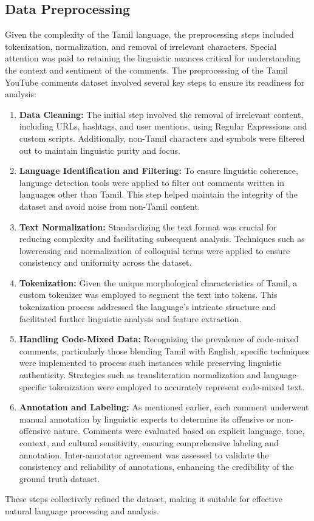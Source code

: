 \documentclass{svproc}
\begin{document}
\subsection{Data Preprocessing}

Given the complexity of the Tamil language, the preprocessing steps included tokenization, normalization, and removal of irrelevant characters. Special attention was paid to retaining the linguistic nuances critical for understanding the context and sentiment of the comments.
The preprocessing of the Tamil YouTube comments dataset involved several key steps to ensure its readiness for analysis:

\begin{enumerate}
\item \textbf{Data Cleaning:} The initial step involved the removal of irrelevant content, including URLs, hashtags, and user mentions, using Regular Expressions and custom scripts. Additionally, non-Tamil characters and symbols were filtered out to maintain linguistic purity and focus.
\item \textbf{Language Identification and Filtering:} To ensure linguistic coherence, language detection tools were applied to filter out comments written in languages other than Tamil. This step helped maintain the integrity of the dataset and avoid noise from non-Tamil content.

\item \textbf{Text Normalization:} Standardizing the text format was crucial for reducing complexity and facilitating subsequent analysis. Techniques such as lowercasing and normalization of colloquial terms were applied to ensure consistency and uniformity across the dataset.

\item \textbf{Tokenization:} Given the unique morphological characteristics of Tamil, a custom tokenizer was employed to segment the text into tokens. This tokenization process addressed the language's intricate structure and facilitated further linguistic analysis and feature extraction.

\item \textbf{Handling Code-Mixed Data:} Recognizing the prevalence of code-mixed comments, particularly those blending Tamil with English, specific techniques were implemented to process such instances while preserving linguistic authenticity. Strategies such as transliteration normalization and language-specific tokenization were employed to accurately represent code-mixed text.

\item \textbf{Annotation and Labeling:} As mentioned earlier, each comment underwent manual annotation by linguistic experts to determine its offensive or non-offensive nature. Comments were evaluated based on explicit language, tone, context, and cultural sensitivity, ensuring comprehensive labeling and annotation. Inter-annotator agreement was assessed to validate the consistency and reliability of annotations, enhancing the credibility of the ground truth dataset.
\end{enumerate}
These steps collectively refined the dataset, making it suitable for effective natural language processing and analysis.
\end{document}
